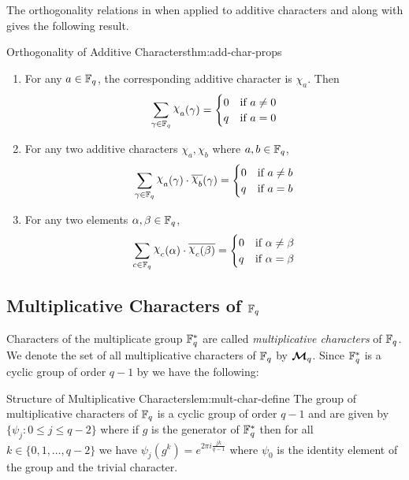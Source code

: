 The orthogonality relations in  when applied to additive characters and along with  gives the following result.
\begin{Theorem}{Orthogonality of Additive Characters}{thm:add-char-props}
  \begin{enumerate}[label=(\roman*)]
    \item For any $a\in\mathbb{F}_q$, the corresponding additive character is $\chi_a$. Then $$\sum_{\gm\in\bbF_q}\chi_a(\gm)=\begin{cases}
              0 & \text{if $a\neq 0$} \\
              q & \text{if $a=0$}
            \end{cases}$$
    \item For any two additive characters $\chi_{a},\chi_{b}$ where $a,b\in\mathbb{F}_q$, $$\sum_{\gm\in\bbF_q}\chi_{a}(\gm)\cdot \ov{\chi_{b}}(\gm)=\begin{cases}
              0 & \text{if $a\neq b$} \\
              q & \text{if $a=b$}
            \end{cases}$$
    \item For any two elements $\alpha,\beta\in\mathbb{F}_q$, $$\sum_{c\in\bbF_q}\chi_c(\alpha)\cdot\ov{\chi_c(\beta)}=\begin{cases}
              0 & \text{if $\alpha\neq \beta$} \\
              q & \text{if $\alpha=\beta$}
            \end{cases}$$
  \end{enumerate}
\end{Theorem}

\subsection{Multiplicative Characters of \texorpdfstring{$\mathbb{F}_q$}{Fq}}\label{sec:mult-char}
Characters of the multiplicate group $\mathbb{F}_q^*$ are called \emph{multiplicative characters} of $\mathbb{F}_q$. We denote the set of all multiplicative characters of $\mathbb{F}_q$ by $\boldsymbol{\mathcal{M}}_q$. Since $\mathbb{F}_q^*$ is a cyclic group of order $q-1$ by  we have the following:
\begin{lemma}{Structure of Multiplicative Characters}{lem:mult-char-define}
  The group of multiplicative characters of $\mathbb{F}_q$ is a cyclic group of order $q-1$ and are given by $\{\psi_j\colon 0\leq j\leq q-2\}$ where if $g$ is the generator of $\mathbb{F}_q^*$ then for all $k\in\{0,1,\dots, q-2\}$ we have $\psi_j(g^k)=e^{2\pi i\frac{jk}{q-1}}$ where $\psi_0$ is the identity element of the group and the trivial character.
\end{lemma}

